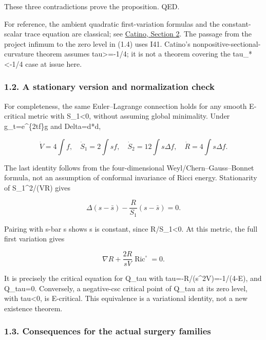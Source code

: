 \documentclass[
  10pt,
]{article}
\begin{document}
These three contradictions prove the proposition. QED.

For reference, the ambient quadratic first-variation formulas and the
constant-scalar trace equation are classical; see
\href{https://www.mate.polimi.it/wp-content/themes/mymate/send_new.php?file=qdd205\&tipo=1}{Catino,
Section 2}. The passage from the project infimum to the zero level in
(1.4) uses I41. Catino's nonpositive-sectional-curvature theorem assumes
tau\textgreater=-1/4; it is not a theorem covering the
tau\_*\textless-1/4 case at issue here.

\hypertarget{a-stationary-version-and-normalization-check}{%
\subsubsection{1.2. A stationary version and normalization
check}\label{a-stationary-version-and-normalization-check}}

For completeness, the same Euler--Lagrange connection holds for any
smooth E-critical metric with S\_1\textless0, without assuming global
minimality. Under g\_t=e\^{}\{2tf\}g and Delta=d*d,

\[
 \dot V=4\int f,\quad \dot S_1=2\int sf,\quad
 \dot S_2=12\int s\Delta f,\quad
 \dot R=4\int s\Delta f.                             \tag{1.5}
\]

The last identity follows from the four-dimensional
Weyl/Chern--Gauss--Bonnet formula, not an assumption of conformal
invariance of Ricci energy. Stationarity of S\_1\^{}2/(VR) gives

\[
 \Delta(s-\bar s)-\frac{R}{S_1}(s-\bar s)=0.
\]

Pairing with s-bar s shows s is constant, since R/S\_1\textless0. At
this metric, the full first variation gives

\[
 \nabla R+\frac{2R}{sV}\operatorname{Ric}^{\circ}=0.
\]

It is precisely the critical equation for Q\_tau with
tau=-R/(s\^{}2V)=-1/(4-E), and Q\_tau=0. Conversely, a negative-csc
critical point of Q\_tau at its zero level, with tau\textless0, is
E-critical. This equivalence is a variational identity, not a new
existence theorem.

\hypertarget{consequences-for-the-actual-surgery-families}{%
\subsubsection{1.3. Consequences for the actual surgery
families}\label{consequences-for-the-actual-surgery-families}}
\end{document}
